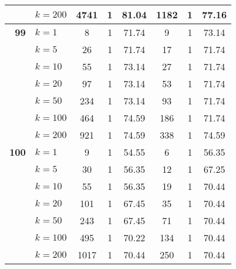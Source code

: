 \begin{table}[htbp]
\begin{tabular}{|l|l|c|c|c|c|c|c|}
     & $k=200$ & 4741 & 1 & 81.04 & 1182 & 1 & 77.16 \\ \hline
    \multicolumn{1}{|r|}{\textbf{99}} & $k=1$ & 8 & 1 & 71.74 & 9 & 1 & 73.14 \\ 
     & $k=5$ & 26 & 1 & 71.74 & 17 & 1 & 71.74 \\ 
     & $k=10$ & 55 & 1 & 73.14 & 27 & 1 & 71.74 \\ 
     & $k=20$ & 97 & 1 & 73.14 & 53 & 1 & 71.74 \\ 
     & $k=50$ & 234 & 1 & 73.14 & 93 & 1 & 71.74 \\ 
     & $k=100$ & 464 & 1 & 74.59 & 186 & 1 & 71.74 \\ 
     & $k=200$ & 921 & 1 & 74.59 & 338 & 1 & 74.59 \\ \hline
    \multicolumn{1}{|r|}{\textbf{100}} & $k=1$ & 9 & 1 & 54.55 & 6 & 1 & 56.35 \\ 
     & $k=5$ & 30 & 1 & 56.35 & 12 & 1 & 67.25 \\ 
     & $k=10$ & 55 & 1 & 56.35 & 19 & 1 & 70.44 \\ 
     & $k=20$ & 101 & 1 & 67.45 & 35 & 1 & 70.44 \\ 
     & $k=50$ & 243 & 1 & 67.45 & 71 & 1 & 70.44 \\ 
     & $k=100$ & 495 & 1 & 70.22 & 134 & 1 & 70.44 \\ 
     & $k=200$ & 1017 & 1 & 70.44 & 250 & 1 & 70.44 \\ \hline
    \end{tabular}
\end{table}